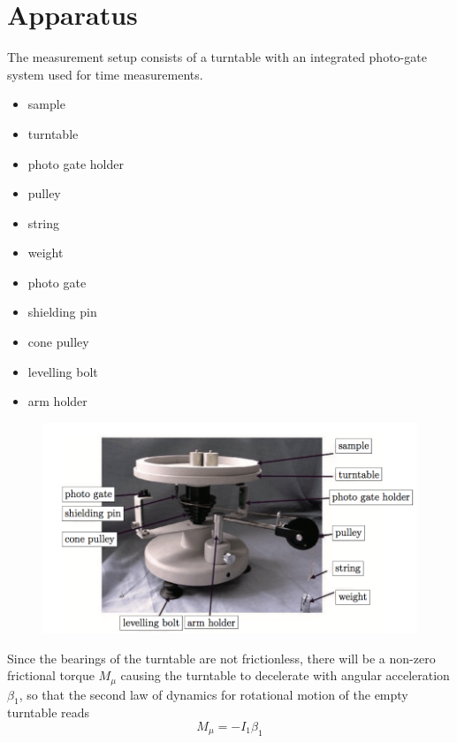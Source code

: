 \section{Apparatus}
The measurement setup consists of a turntable with an integrated photo-gate
system used for time measurements.
\singlespacing
\begin{itemize}
\item sample
\item turntable
\item photo gate holder
\item pulley
\item string
\item weight
\item photo gate
\item shielding pin
\item cone pulley
\item levelling bolt
\item arm holder
\end{itemize}
\doublespacing

\begin{figure}[H]
\centering
\includegraphics[width=15cm]{fig/app/turntable}
\end{figure}

Since the bearings of the turntable are not frictionless, there will be a
non-zero frictional torque $M_μ$ causing the turntable to decelerate with
angular acceleration $\beta_1$, so that the second law of dynamics for
rotational motion of the empty turntable reads $$   M_\mu = -I_1\beta_1  $$
